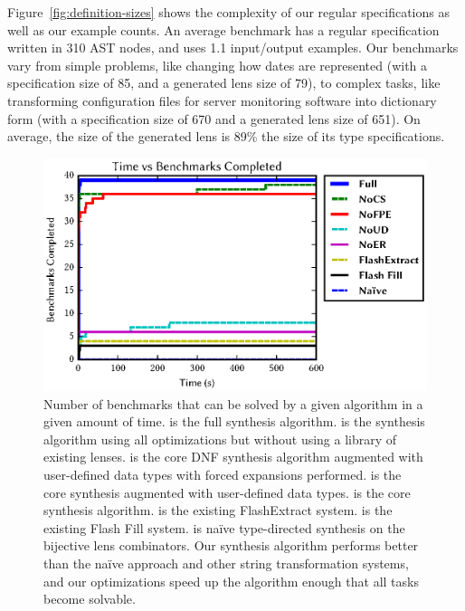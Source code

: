 \documentclass[acmsmall,screen]{acmart}
\begin{document}
Figure~\ref{fig:definition-sizes} shows the complexity of our regular
specifications as well as our example counts.
An average benchmark has a regular specification written in 310 AST nodes, and
uses 1.1 input/output examples.
Our benchmarks vary from simple problems, like changing how dates are represented
(with a specification size of 85, and a generated lens size of 79), to 
complex tasks, like transforming configuration files for server monitoring
software into dictionary form (with a specification size of 670 and
a generated lens size of 651).  On average, the size of the generated lens is
89\% the size of its type specifications.

\begin{figure}
  \includegraphics{generated-graphs/times}
  \caption{
    Number of benchmarks that can be solved by a given algorithm in a given
    amount of time. \FullMode{} is the full synthesis
    algorithm.
    \NoCSMode{} is
    the synthesis algorithm using all optimizations but without using
    a library of
    existing lenses.  \NoFPEMode{} is the core DNF synthesis algorithm
    augmented with user-defined data types with
    forced expansions performed.  \NoERMode{} is the core synthesis
    augmented with
    user-defined data types.  \NoUDMode{} is the core synthesis algorithm.
    \FlashExtractMode{} is the existing FlashExtract system.  \FlashFillMode{} is
    the existing Flash Fill system.  \NaiveMode{} is na\"{i}ve type-directed 
    synthesis on the bijective lens combinators.  Our synthesis algorithm performs
    better than the na\"{i}ve approach and other string transformation systems,
    and our optimizations speed up the algorithm enough that all tasks become
    solvable.
  }
  \label{fig:synthesis-times}
\end{figure}
\end{document}
